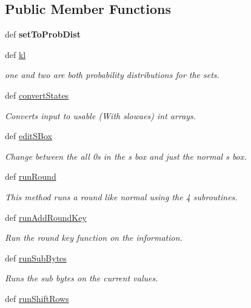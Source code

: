 \subsection*{Public Member Functions}
\begin{DoxyCompactItemize}
\item 
\hypertarget{classsimplegui_1_1_main_scene_a2c8156bf798a6cbcc85f8f70b92877c1}{def {\bfseries set\-To\-Prob\-Dist}}\label{classsimplegui_1_1_main_scene_a2c8156bf798a6cbcc85f8f70b92877c1}

\item 
def \hyperlink{classsimplegui_1_1_main_scene_ac7eb263562c3f9a992a00d43ddd7d1a6}{kl}
\begin{DoxyCompactList}\small\item\em one and two are both probability distributions for the sets. \end{DoxyCompactList}\item 
def \hyperlink{classsimplegui_1_1_main_scene_a2fedafb26922217bff2c9b4f0a1e1980}{convert\-States}
\begin{DoxyCompactList}\small\item\em Converts input to usable (With slowaes) int arrays. \end{DoxyCompactList}\item 
def \hyperlink{classsimplegui_1_1_main_scene_a464f594963c80652f89a341d86e675ab}{edit\-S\-Box}
\begin{DoxyCompactList}\small\item\em Change between the all 0s in the s box and just the normal s box. \end{DoxyCompactList}\item 
def \hyperlink{classsimplegui_1_1_main_scene_a3e84e45150794e1806472cd45904f9b9}{run\-Round}
\begin{DoxyCompactList}\small\item\em This method runs a round like normal using the 4 subroutines. \end{DoxyCompactList}\item 
def \hyperlink{classsimplegui_1_1_main_scene_a13363bc98bb9603d8c0ab35d52cc853b}{run\-Add\-Round\-Key}
\begin{DoxyCompactList}\small\item\em Run the round key function on the information. \end{DoxyCompactList}\item 
def \hyperlink{classsimplegui_1_1_main_scene_a8e81494def3ea3c0e56813f6d702a435}{run\-Sub\-Bytes}
\begin{DoxyCompactList}\small\item\em Runs the sub bytes on the current values. \end{DoxyCompactList}\item 
\hypertarget{classsimplegui_1_1_main_scene_a900ce77068dfc386d298f7ef1243529a}{def \hyperlink{classsimplegui_1_1_main_scene_a900ce77068dfc386d298f7ef1243529a}{run\-Shift\-Rows}}\label{classsimplegui_1_1_main_scene_a900ce77068dfc386d298f7ef1243529a}


\end{DoxyCompactItemize}
